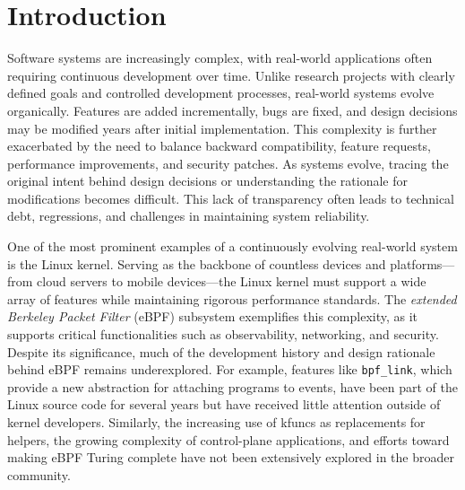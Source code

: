 \documentclass[sigconf,review,anonymous]{acmart}
\begin{document}


\maketitle

\section{Introduction}

Software systems are increasingly complex, with real-world applications often requiring continuous development over time. Unlike research projects with clearly defined goals and controlled development processes, real-world systems evolve organically. Features are added incrementally, bugs are fixed, and design decisions may be modified years after initial implementation. This complexity is further exacerbated by the need to balance backward compatibility, feature requests, performance improvements, and security patches. As systems evolve, tracing the original intent behind design decisions or understanding the rationale for modifications becomes difficult. This lack of transparency often leads to technical debt, regressions, and challenges in maintaining system reliability.

One of the most prominent examples of a continuously evolving real-world system is the Linux kernel. Serving as the backbone of countless devices and platforms—from cloud servers to mobile devices—the Linux kernel must support a wide array of features while maintaining rigorous performance standards. The \textit{extended Berkeley Packet Filter} (eBPF)\cite{ebpf} subsystem exemplifies this complexity, as it supports critical functionalities such as observability\cite{shen2023network}, networking\cite{vieira2020fast}, and security\cite{deri2019combining}. Despite its significance, much of the development history and design rationale behind eBPF remains underexplored. For example, features like \texttt{bpf\_link}\cite{bpflink}, which provide a new abstraction for attaching programs to events, have been part of the Linux source code for several years but have received little attention outside of kernel developers. Similarly, the increasing use of kfuncs \cite{kfuncs} as replacements for helpers, the growing complexity of control-plane applications, and efforts toward making eBPF Turing complete have not been extensively explored in the broader community.
\end{document}
